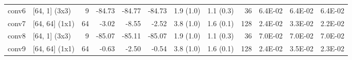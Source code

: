 \begin{table}
\begin{tabular}{llrrrrllrrrr}
conv6 & [64, 1] (3x3) & 9 & {\cellcolor[HTML]{A50026}} \color[HTML]{F1F1F1} -84.73 & {\cellcolor[HTML]{A50026}} \color[HTML]{F1F1F1} -84.77 & {\cellcolor[HTML]{A50026}} \color[HTML]{F1F1F1} -84.73 & 1.9 (1.0) & 1.1 (0.3) & 36 & {\cellcolor[HTML]{C21C27}} \color[HTML]{F1F1F1} 6.4E-02 & {\cellcolor[HTML]{C21C27}} \color[HTML]{F1F1F1} 6.4E-02 & {\cellcolor[HTML]{C21C27}} \color[HTML]{F1F1F1} 6.4E-02 \\
conv7 & [64, 64] (1x1) & 64 & {\cellcolor[HTML]{EFF8AA}} \color[HTML]{000000} -3.02 & {\cellcolor[HTML]{FEFFBE}} \color[HTML]{000000} -8.55 & {\cellcolor[HTML]{EFF8AA}} \color[HTML]{000000} -2.52 & 3.8 (1.0) & 1.6 (0.1) & 128 & {\cellcolor[HTML]{FFF1A8}} \color[HTML]{000000} 2.4E-02 & {\cellcolor[HTML]{FED07E}} \color[HTML]{000000} 3.3E-02 & {\cellcolor[HTML]{FFF7B2}} \color[HTML]{000000} 2.2E-02 \\
conv8 & [64, 1] (3x3) & 9 & {\cellcolor[HTML]{A50026}} \color[HTML]{F1F1F1} -85.07 & {\cellcolor[HTML]{A50026}} \color[HTML]{F1F1F1} -85.11 & {\cellcolor[HTML]{A50026}} \color[HTML]{F1F1F1} -85.07 & 1.9 (1.0) & 1.1 (0.3) & 36 & {\cellcolor[HTML]{A50026}} \color[HTML]{F1F1F1} 7.0E-02 & {\cellcolor[HTML]{A50026}} \color[HTML]{F1F1F1} 7.0E-02 & {\cellcolor[HTML]{A50026}} \color[HTML]{F1F1F1} 7.0E-02 \\
conv9 & [64, 64] (1x1) & 64 & {\cellcolor[HTML]{E9F6A1}} \color[HTML]{000000} -0.63 & {\cellcolor[HTML]{EFF8AA}} \color[HTML]{000000} -2.50 & {\cellcolor[HTML]{E9F6A1}} \color[HTML]{000000} -0.54 & 3.8 (1.0) & 1.6 (0.1) & 128 & {\cellcolor[HTML]{FFF0A6}} \color[HTML]{000000} 2.4E-02 & {\cellcolor[HTML]{FEC877}} \color[HTML]{000000} 3.5E-02 & {\cellcolor[HTML]{FFF5AE}} \color[HTML]{000000} 2.3E-02 \\
\bottomrule
\end{tabular}
\end{table}

